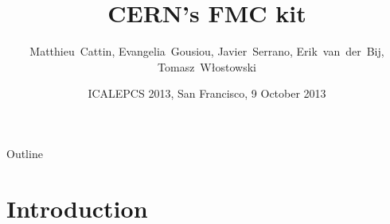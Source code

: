 \documentclass[compress,red]{beamer}
\title[CERN's FMC kit] %
{CERN's FMC kit}
\author[Matthieu Cattin] %
{\mbox{Matthieu Cattin}, \mbox{Evangelia Gousiou}, \mbox{Javier Serrano}, \mbox{Erik van der Bij}, \mbox{Tomasz W\l{}ostowski}}
\institute%
{
  CERN, Geneva, Switzerland
 }
\date[ICALEPCS 2013] %
{ICALEPCS 2013, San Francisco, 9 October 2013}
\begin{document}
\begin{frame}
  \titlepage
\end{frame}

\begin{frame}{Outline}
  \tableofcontents
\end{frame}







\section{Introduction}

\subsection*{}
\end{document}
